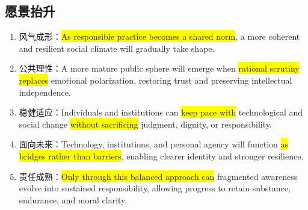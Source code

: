 ﻿\documentclass[lang=cn,11pt]{elegantbook}
\begin{document}
\subsection{愿景抬升}

\begin{enumerate}
    \item 风气成形：\colorbox{yellow}{As responsible practice becomes a shared norm}, a more coherent and resilient social climate will gradually take shape.
    \item 公共理性：A more mature public sphere will emerge when \colorbox{yellow}{rational scrutiny replaces} emotional polarization, restoring trust and preserving intellectual independence.
    \item 稳健适应：Individuals and institutions can \colorbox{yellow}{keep pace with} technological and social change \colorbox{yellow}{without sacrificing} judgment, dignity, or responsibility.
    \item 面向未来：Technology, institutions, and personal agency will function \colorbox{yellow}{as bridges rather than barriers}, enabling clearer identity and stronger resilience.
    \item 责任成熟：\colorbox{yellow}{Only through this balanced approach can} fragmented awareness evolve into sustained responsibility, allowing progress to retain substance, endurance, and moral clarity.
\end{enumerate}
\end{document}
